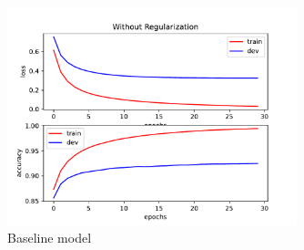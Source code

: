 \begin{answer}
    \begin{figure}[H]
        \centering
        \includegraphics[width=0.75\textwidth]{../src/mnist/baseline.pdf}
        \caption{Baseline model}
        \label{fig:baseline}
    \end{figure}
\end{answer}
   
  
